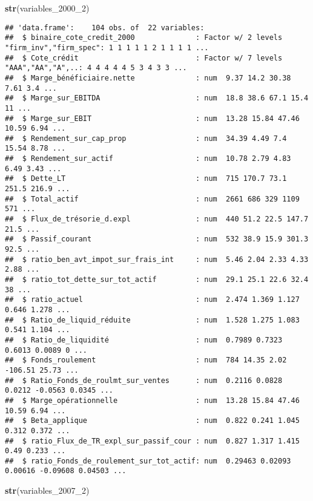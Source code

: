 \documentclass[
]{article}
\newenvironment{Shaded}{\begin{snugshade}}{\end{snugshade}}
\newcommand{\DecValTok}[1]{\textcolor[rgb]{0.00,0.00,0.81}{#1}}
\newcommand{\KeywordTok}[1]{\textcolor[rgb]{0.13,0.29,0.53}{\textbf{#1}}}
\newcommand{\NormalTok}[1]{#1}
\begin{document}
\begin{Shaded}
\begin{Highlighting}[]
\KeywordTok{str}\NormalTok{(variables_}\DecValTok{2000}\NormalTok{_}\DecValTok{2}\NormalTok{)}
\end{Highlighting}
\end{Shaded}

\begin{verbatim}
## 'data.frame':    104 obs. of  22 variables:
##  $ binaire_cote_credit_2000              : Factor w/ 2 levels "firm_inv","firm_spec": 1 1 1 1 1 2 1 1 1 1 ...
##  $ Cote_crédit                           : Factor w/ 7 levels "AAA","AA","A",..: 4 4 4 4 4 5 3 4 3 3 ...
##  $ Marge_bénéficiaire.nette              : num  9.37 14.2 30.38 7.61 3.4 ...
##  $ Marge_sur_EBITDA                      : num  18.8 38.6 67.1 15.4 11 ...
##  $ Marge_sur_EBIT                        : num  13.28 15.84 47.46 10.59 6.94 ...
##  $ Rendement_sur_cap_prop                : num  34.39 4.49 7.4 15.54 8.78 ...
##  $ Rendement_sur_actif                   : num  10.78 2.79 4.83 6.49 3.43 ...
##  $ Dette_LT                              : num  715 170.7 73.1 251.5 216.9 ...
##  $ Total_actif                           : num  2661 686 329 1109 571 ...
##  $ Flux_de_trésorie_d.expl               : num  440 51.2 22.5 147.7 21.5 ...
##  $ Passif_courant                        : num  532 38.9 15.9 301.3 92.5 ...
##  $ ratio_ben_avt_impot_sur_frais_int     : num  5.46 2.04 2.33 4.33 2.88 ...
##  $ ratio_tot_dette_sur_tot_actif         : num  29.1 25.1 22.6 32.4 38 ...
##  $ ratio_actuel                          : num  2.474 1.369 1.127 0.646 1.278 ...
##  $ Ratio_de_liquid_réduite               : num  1.528 1.275 1.083 0.541 1.104 ...
##  $ Ratio_de_liquidité                    : num  0.7989 0.7323 0.6013 0.0089 0 ...
##  $ Fonds_roulement                       : num  784 14.35 2.02 -106.51 25.73 ...
##  $ Ratio_Fonds_de_roulmt_sur_ventes      : num  0.2116 0.0828 0.0212 -0.0563 0.0345 ...
##  $ Marge_opérationnelle                  : num  13.28 15.84 47.46 10.59 6.94 ...
##  $ Beta_applique                         : num  0.822 0.241 1.045 0.312 0.372 ...
##  $ ratio_Flux_de_TR_expl_sur_passif_cour : num  0.827 1.317 1.415 0.49 0.233 ...
##  $ ratio_Fonds_de_roulement_sur_tot_actif: num  0.29463 0.02093 0.00616 -0.09608 0.04503 ...
\end{verbatim}

\begin{Shaded}
\begin{Highlighting}[]
\KeywordTok{str}\NormalTok{(variables_}\DecValTok{2007}\NormalTok{_}\DecValTok{2}\NormalTok{)}
\end{Highlighting}
\end{Shaded}
\end{document}
